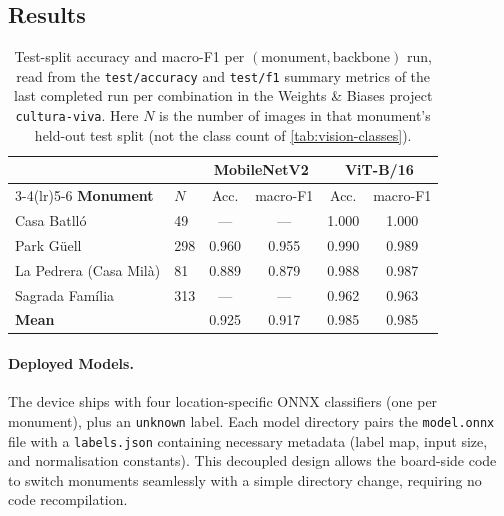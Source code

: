 \documentclass[11pt,a4paper]{article}
\begin{document}
\subsection{Results}

\begin{table}[h]
\centering
\caption{Test-split accuracy and macro-F1 per $(\text{monument},
\text{backbone})$ run, read from the \texttt{test/accuracy} and
\texttt{test/f1} summary metrics of the last completed run per combination in
the Weights \& Biases project \texttt{cultura-viva}. Here $N$ is the number of
images in that monument's held-out test split (not the class count of
\cref{tab:vision-classes}).}
\label{tab:vision-results}
\begin{tabular}{llcccc}
\toprule
& & \multicolumn{2}{c}{\textbf{MobileNetV2}} & \multicolumn{2}{c}{\textbf{ViT-B/16}} \\
\cmidrule(lr){3-4}\cmidrule(lr){5-6}
\textbf{Monument} & \textbf{$N$} & Acc. & macro-F1 & Acc. & macro-F1 \\
\midrule
Casa Batll\'o            & 49  & --- & --- & 1.000 & 1.000 \\
Park G\"uell             & 298 & 0.960 & 0.955 & 0.990 & 0.989 \\
La Pedrera (Casa Mil\`a) & 81  & 0.889 & 0.879 & 0.988 & 0.987 \\
Sagrada Fam\'ilia        & 313 & ---   & ---   & 0.962 & 0.963 \\
\midrule
\textbf{Mean}\footnotemark &  & 0.925 & 0.917 & 0.985 & 0.985 \\
\bottomrule
\end{tabular}
\end{table}

\paragraph{Deployed Models.} The device ships with four location-specific ONNX classifiers (one per monument), plus an \texttt{unknown} label. Each model directory pairs the \texttt{model.onnx} file with a \texttt{labels.json} containing necessary metadata (label map, input size, and normalisation constants). This decoupled design allows the board-side code to switch monuments seamlessly with a simple directory change, requiring no code recompilation.
\end{document}
